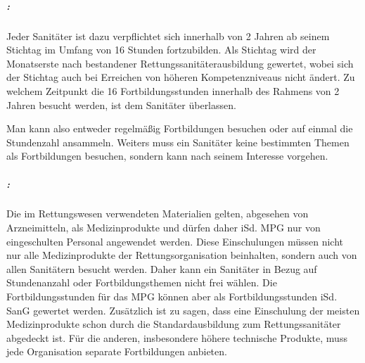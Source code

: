 






\subparagraph{  :}

Jeder Sanitäter ist dazu verpflichtet sich innerhalb von 2 Jahren ab
seinem Stichtag im Umfang von 16 Stunden fortzubilden. Als Stichtag
wird der Monatserste nach bestandener Rettungssanitäterausbildung
gewertet, wobei sich der Stichtag auch bei Erreichen von höheren
Kompetenzniveaus nicht ändert. Zu welchem Zeitpunkt die 16
Fortbildungsstunden innerhalb des Rahmens von 2 Jahren besucht werden,
ist dem Sanitäter überlassen.

Man kann also entweder regelmäßig Fortbildungen besuchen oder auf
einmal die Stundenzahl ansammeln. Weiters muss ein Sanitäter keine
bestimmten Themen als Fortbildungen besuchen, sondern kann nach seinem
Interesse vorgehen.

\subparagraph{ 
:}

Die im Rettungswesen verwendeten Materialien gelten, abgesehen von
Arzneimitteln, als Medizinprodukte und dürfen daher iSd. MPG nur von
eingeschulten Personal angewendet werden. Diese Einschulungen müssen
nicht nur alle Medizinprodukte der Rettungsorganisation beinhalten,
sondern auch von allen Sanitätern besucht werden. Daher kann ein
Sanitäter in Bezug auf Stundenanzahl oder Fortbildungsthemen nicht
frei wählen. Die Fortbildungsstunden für das MPG können aber als
Fortbildungsstunden iSd. SanG gewertet werden. Zusätzlich ist zu
sagen, dass eine Einschulung der meisten Medizinprodukte schon durch
die Standardausbildung zum Rettungssanitäter abgedeckt ist. Für
die anderen, insbesondere höhere technische Produkte, muss jede
Organisation separate Fortbildungen anbieten.

